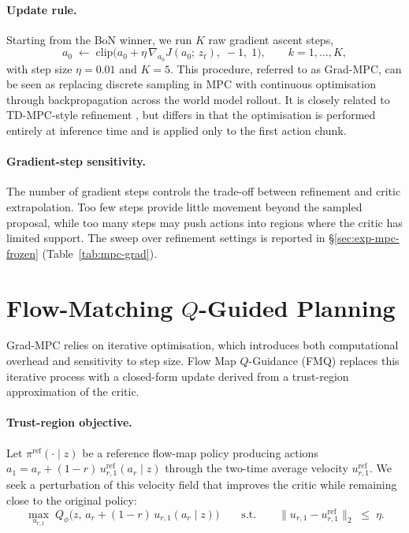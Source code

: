 \paragraph{Update rule.}
Starting from the BoN winner, we run $K$ raw gradient ascent steps,
\begin{equation}
    a_0 \;\leftarrow\; \mathrm{clip}\!\Big(a_0 + \eta\,\nabla_{a_0} J(a_0;\,z_t),\;-1,\;1\Big),
    \qquad k = 1, \dots, K,
    \label{eq:mpc-grad}
\end{equation}
with step size $\eta = 0.01$ and $K=5$. This procedure, referred to
as Grad-MPC, can be seen as replacing discrete sampling in MPC with
continuous optimisation through backpropagation across the world
model rollout. It is closely related to TD-MPC-style refinement \cite{hansen2022temporaldifferencelearningmodel}, but
differs in that the optimisation is performed entirely at inference
time and is applied only to the first action chunk.

\paragraph{Gradient-step sensitivity.}
The number of gradient steps controls the trade-off between refinement
and critic extrapolation. Too few steps provide little movement beyond
the sampled proposal, while too many steps may push actions into regions
where the critic has limited support. The sweep over refinement settings
is reported in \S\ref{sec:exp-mpc-frozen} (Table~\ref{tab:mpc-grad}).

\section{Flow-Matching $Q$-Guided Planning}
\label{sec:mpc-fmq}

Grad-MPC relies on iterative optimisation, which introduces both
computational overhead and sensitivity to step size. Flow Map
$Q$-Guidance (FMQ) \cite{ziakas2026aligningflowmappolicies} replaces this iterative process with a
closed-form update derived from a trust-region approximation of the
critic.

\paragraph{Trust-region objective.}
Let $\pi^{\mathrm{ref}}(\cdot \mid z)$ be a reference flow-map
policy producing actions $a_1 = a_r + (1-r)\,u^{\mathrm{ref}}_{r,1}(a_r \mid z)$
through the two-time average velocity $u^{\mathrm{ref}}_{r,1}$.
We seek a perturbation of this velocity field that improves the
critic while remaining close to the original policy:
\begin{equation}
    \max_{u_{r,1}}\; Q_\phi\!\big(z,\, a_r + (1-r)\, u_{r,1}(a_r \mid z)\big)
    \qquad\text{s.t.}\qquad
    \big\|u_{r,1} - u^{\mathrm{ref}}_{r,1}\big\|_2 \;\le\; \eta.
    \label{eq:mpc-fmq-objective}
\end{equation}

